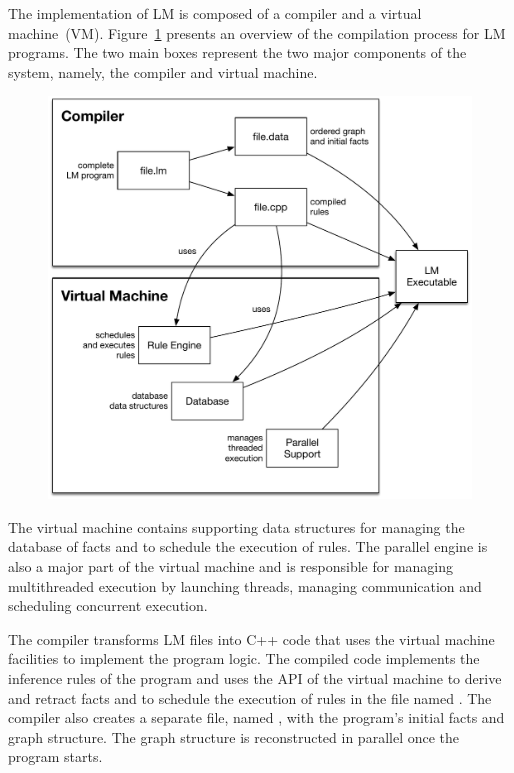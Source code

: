 The implementation of LM is composed of a compiler and a virtual machine~(VM).
Figure~\ref{fig:implementation:overview} presents an overview of the compilation
process for LM programs. The two main boxes represent the two major components
of the system, namely, the compiler and virtual machine.

\begin{figure}[ht]
  \centering
  \includegraphics[width=.75\linewidth]{figures/implementation/overview.pdf}


  \label{fig:implementation:overview}
\end{figure}

The virtual machine contains supporting data structures for managing the
database of facts and to schedule the execution of rules. The parallel engine is
also a major part of the virtual machine and is responsible for managing
multithreaded execution by launching threads, managing communication and
scheduling concurrent execution.

The compiler transforms LM files into C++ code that uses the virtual machine
facilities to implement the program logic.  The compiled code implements the
inference rules of the program and uses the API of the virtual machine to derive
and retract facts and to schedule the execution of rules in the file named
. The compiler also creates a separate file, named
, with the program's initial facts and graph structure. The
graph structure is reconstructed in parallel once the program starts.

